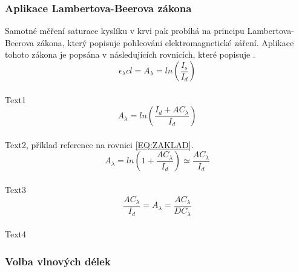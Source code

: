 \subsubsection{Aplikace Lambertova-Beerova zákona} Samotné měření saturace kyslíku v krvi pak probíhá na principu Lambertova-Beerova zákona, který popisuje pohlcováni elektromagnetické záření. Aplikace tohoto zákona je popsána v následujících rovnicích, které popisuje \cite{KYRIACOU}.
\begin{equation}%
  {\epsilon_{\lambda}cl} = A_{\lambda} = ln(\frac{I_s}{I_d})  
\end{equation}\\
Text1\\
\begin{equation}
    A_{\lambda} = ln(\frac{I_d+AC_{\lambda}}{I_d})
    \label{EQ:ZAKLAD}
\end{equation}\\
Text2, příklad reference na rovnici \ref{EQ:ZAKLAD}.\\
\begin{equation}
    A_{\lambda} = ln(1+\frac{AC_{\lambda}}{I_d}) \simeq \frac{AC_{\lambda}}{I_d}
\end{equation}\\
Text3\\
\begin{equation}
    \frac{AC_{\lambda}}{I_d} = A_{\lambda} = \frac{AC_{\lambda}}{DC_{\lambda}}\end{equation}\\
Text4\\

\subsubsection{Volba vlnových délek}
 

